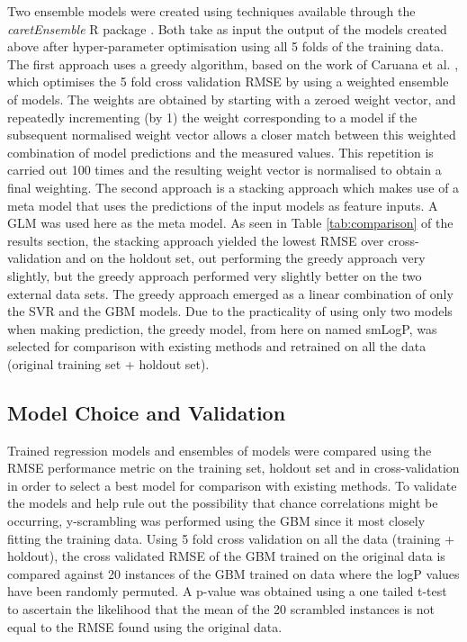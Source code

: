 \documentclass[10pt]{bmc_article}
\newenvironment{bmcformat}{\begin{raggedright}\baselineskip20pt\sloppy\setboolean{publ}{false}}{\end{raggedright}\baselineskip20pt\sloppy}
\begin{document}
\begin{bmcformat}
Two ensemble models were created using techniques available through the \textit{caretEnsemble} R package \cite{caretEnsemble}. Both take as input the output of the models created above after hyper-parameter optimisation using all 5 folds of the training data. The first approach uses a greedy algorithm, based on the work of Caruana et al. \cite{caruana_ensemble_2004}, which optimises the 5 fold cross validation RMSE by using a weighted ensemble of models. The weights are obtained by starting with a zeroed weight vector, and repeatedly incrementing (by 1) the weight corresponding to a model if the subsequent normalised weight vector allows a closer match between this weighted combination of model predictions and the measured values. This repetition is carried out 100 times and the resulting weight vector is normalised to obtain a final weighting. The second approach is a stacking approach which makes use of a meta model that uses the predictions of the input models as feature inputs. A GLM was used here as the meta model. As seen in Table \ref{tab:comparison} of the results section, the stacking approach yielded the lowest RMSE over cross-validation and on the holdout set, out performing the greedy approach very slightly, but the greedy approach performed very slightly better on the two external data sets. The greedy approach emerged as a linear combination of only the SVR and the GBM models. Due to the practicality of using only two models when making prediction, the greedy model, from here on named smLogP, was selected for comparison with existing methods and retrained on all the data (original training set + holdout set). 

\subsection*{Model Choice and Validation}

Trained regression models and ensembles of models were compared using the RMSE performance metric on the training set, holdout set and in cross-validation in order to select a best model for comparison with existing methods. To validate the models and help rule out the possibility that chance correlations might be occurring, y-scrambling was performed using the GBM since it most closely fitting the training data. Using 5 fold cross validation on all the data (training + holdout), the cross validated RMSE of the GBM trained on the original data is compared against 20 instances of the GBM trained on data where the logP values have been randomly permuted. A p-value was obtained using a one tailed t-test to ascertain the likelihood that the mean of the 20 scrambled instances is not equal to the RMSE found using the original data.


\end{bmcformat}
\end{document}
